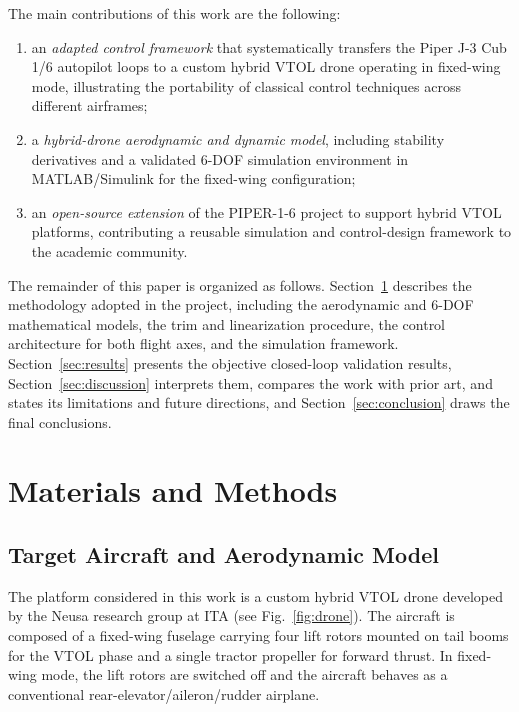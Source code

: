 \documentclass{ieeeaccess}
\begin{document}
The main contributions of this work are the following:
\begin{enumerate}
    \item an \textit{adapted control framework} that systematically transfers the Piper J-3 Cub 1/6 autopilot loops to a custom hybrid VTOL drone operating in fixed-wing mode, illustrating the portability of classical control techniques across different airframes;
    \item a \textit{hybrid-drone aerodynamic and dynamic model}, including stability derivatives and a validated 6-DOF simulation environment in MATLAB/Simulink for the fixed-wing configuration;
    \item an \textit{open-source extension} of the PIPER-1-6 project to support hybrid VTOL platforms, contributing a reusable simulation and control-design framework to the academic community.
\end{enumerate}

The remainder of this paper is organized as follows. Section~\ref{sec:methods} describes the methodology adopted in the project, including the aerodynamic and 6-DOF mathematical models, the trim and linearization procedure, the control architecture for both flight axes, and the simulation framework. Section~\ref{sec:results} presents the objective closed-loop validation results, Section~\ref{sec:discussion} interprets them, compares the work with prior art, and states its limitations and future directions, and Section~\ref{sec:conclusion} draws the final conclusions.

\section{Materials and Methods}
\label{sec:methods}

\subsection{Target Aircraft and Aerodynamic Model}

The platform considered in this work is a custom hybrid VTOL drone developed by the Neusa research group at ITA (see Fig.~\ref{fig:drone}). The aircraft is composed of a fixed-wing fuselage carrying four lift rotors mounted on tail booms for the VTOL phase and a single tractor propeller for forward thrust. In fixed-wing mode, the lift rotors are switched off and the aircraft behaves as a conventional rear-elevator/aileron/rudder airplane.
\end{document}
